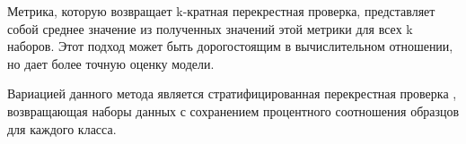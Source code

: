 Метрика, которую возвращает k-кратная перекрестная проверка, представляет собой среднее значение из полученных значений этой метрики 
для всех k наборов. Этот подход может быть дорогостоящим в вычислительном отношении, но дает более точную оценку модели.

Вариацией данного метода является стратифицированная перекрестная проверка \cite{stratifiedKFold}, возвращающая наборы данных с  
сохранением процентного соотношения образцов для каждого класса.
